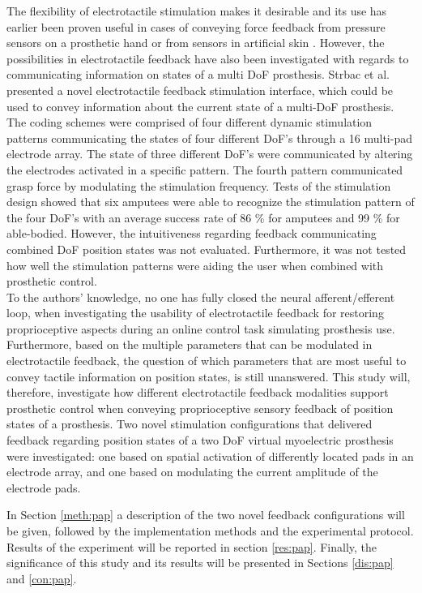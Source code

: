 %
The flexibility of electrotactile stimulation makes it desirable and its use has earlier been proven useful in cases of conveying force feedback from pressure sensors on a prosthetic hand or from sensors in artificial skin \cite{Hartmann2014,Franceschi2015}. However, the possibilities in electrotactile feedback have also been investigated with regards to communicating information on states of a multi DoF prosthesis. Strbac et al. \cite{Strbac2016} presented a novel electrotactile feedback stimulation interface, which could be used to convey information about the current state of a multi-DoF prosthesis. The coding schemes were comprised of four different dynamic stimulation patterns communicating the states of four different DoF's through a 16 multi-pad electrode array. The state of three different DoF's were communicated by altering the electrodes activated in a specific pattern. The fourth pattern communicated grasp force by modulating the stimulation frequency. Tests of the stimulation design showed that six amputees were able to recognize the stimulation pattern of the four DoF's with an average success rate of 86 \% for amputees and 99 \% for able-bodied. \cite{Strbac2016} However, the intuitiveness regarding feedback communicating combined DoF position states was not evaluated. Furthermore, it was not tested how well the stimulation patterns were aiding the user when combined with prosthetic control.  \\   
%
To the authors' knowledge, no one has fully closed the neural afferent/efferent loop, when investigating the usability of electrotactile feedback for restoring proprioceptive aspects during an online control task simulating prosthesis use. Furthermore, based on the multiple parameters that can be modulated in electrotactile feedback, the question of which parameters that are most useful to convey tactile information on position states, is still unanswered. This study will, therefore, investigate how different electrotactile feedback modalities support prosthetic control when conveying proprioceptive sensory feedback of position states of a prosthesis. Two novel stimulation configurations that delivered feedback regarding position states of a two DoF virtual myoelectric prosthesis were investigated: one based on spatial activation of differently located pads in an electrode array, and one based on modulating the current amplitude of the electrode pads.

In Section \ref{meth:pap} a description of the two novel feedback configurations will be given, followed by the implementation methods and the experimental protocol. Results of the experiment will be reported in section \ref{res:pap}. Finally, the significance of this study and its results will be presented in Sections \ref{dis:pap} and \ref{con:pap}. 

















